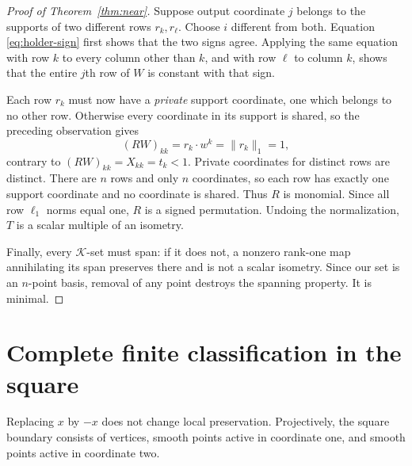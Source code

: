 \documentclass[11pt]{article}
\theoremstyle{definition}
\theoremstyle{remark}
\newcommand{\K}{\mathcal K}
\begin{document}
\begin{proof}[Proof of Theorem~\ref{thm:near}]
Suppose output coordinate $j$ belongs to the supports of two different rows
$r_k,r_\ell$.  Choose $i$ different from both.  Equation
\eqref{eq:holder-sign} first shows that the two signs agree.  Applying the
same equation with row $k$ to every column other than $k$, and with row
$\ell$ to column $k$, shows that the entire $j$th row of $W$ is constant
with that sign.

Each row $r_k$ must now have a \emph{private} support coordinate, one which
belongs to no other row.  Otherwise every coordinate in its support is
shared, so the preceding observation gives
\[
 (RW)_{kk}=r_k\cdot w^k=\|r_k\|_1=1,
\]
contrary to $(RW)_{kk}=X_{kk}=t_k<1$.  Private coordinates for distinct rows
are distinct.  There are $n$ rows and only $n$ coordinates, so each row has
exactly one support coordinate and no coordinate is shared.  Thus $R$ is
monomial.  Since all row $\ell_1$ norms equal one, $R$ is a signed
permutation.  Undoing the normalization, $T$ is a scalar multiple of an
isometry.

Finally, every $\K$-set must span: if it does not, a nonzero rank-one map
annihilating its span preserves there and is not a scalar isometry.  Since
our set is an $n$-point basis, removal of any point destroys the spanning
property.  It is minimal.
\end{proof}

\section{Complete finite classification in the square}

Replacing $x$ by $-x$ does not change local preservation.  Projectively, the
square boundary consists of vertices, smooth points active in coordinate
one, and smooth points active in coordinate two.
\end{document}
